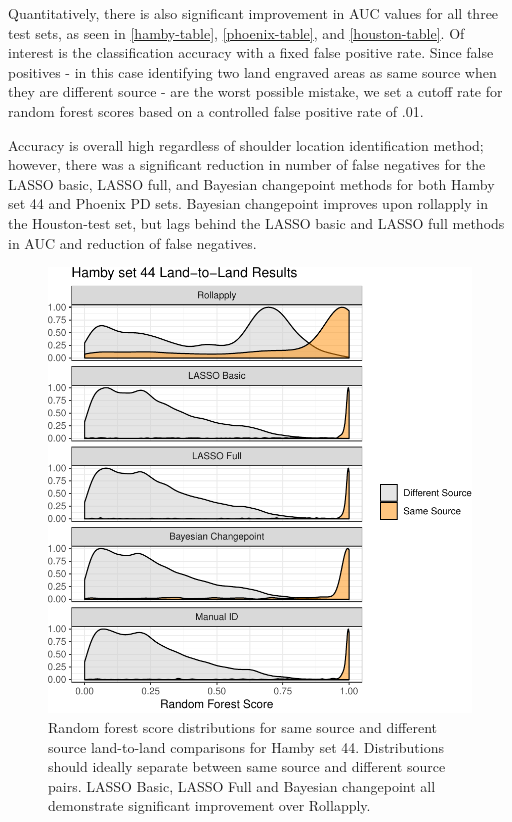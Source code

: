 \documentclass[12pt]{article}
\begin{document}
Quantitatively, there is also significant improvement in AUC values for
all three test sets, as seen in \autoref{hamby-table},
\autoref{phoenix-table}, and \autoref{houston-table}. Of interest is the
classification accuracy with a fixed false positive rate. Since false
positives - in this case identifying two land engraved areas as same
source when they are different source - are the worst possible mistake,
we set a cutoff rate for random forest scores based on a controlled
false positive rate of .01.

Accuracy is overall high regardless of shoulder location identification
method; however, there was a significant reduction in number of false
negatives for the LASSO basic, LASSO full, and Bayesian changepoint
methods for both Hamby set 44 and Phoenix PD sets. Bayesian changepoint
improves upon rollapply in the Houston-test set, but lags behind the
LASSO basic and LASSO full methods in AUC and reduction of false
negatives.

\begin{figure}
\centering
\includegraphics{writeup_files/figure-latex/hamby-groove-results-1.pdf}
\caption{\label{hamby-groove-results}Random forest score distributions
for same source and different source land-to-land comparisons for Hamby
set 44. Distributions should ideally separate between same source and
different source pairs. LASSO Basic, LASSO Full and Bayesian changepoint
all demonstrate significant improvement over Rollapply.}
\end{figure}
\end{document}
